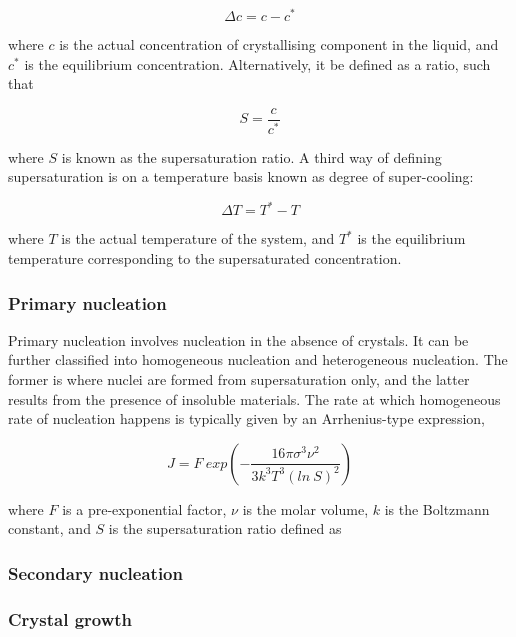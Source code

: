 \begin{equation}
    \Delta c = c - c^*
\end{equation}

\noindent where $c$ is the actual concentration of crystallising component in the liquid, and $c^*$ is the equilibrium concentration. Alternatively, it be defined as a ratio, such that

\begin{equation}
    S = \frac{c}{c^*}
\end{equation}

\noindent where $S$ is known as the supersaturation ratio. A third way of defining supersaturation is on a temperature basis known as degree of super-cooling:

\begin{equation}
     \Delta T = T^* - T 
\end{equation}

\noindent where $T$ is the actual temperature of the system, and $T^*$ is the equilibrium temperature corresponding to the supersaturated concentration. 

\subsubsection{Primary nucleation}

Primary nucleation involves nucleation in the absence of crystals. \cite{seader_separation_2011} It can be further classified into homogeneous nucleation and heterogeneous nucleation. The former is where nuclei are formed from supersaturation only, and the latter results from the presence of insoluble materials. \cite{richardson} The rate at which homogeneous rate of nucleation happens is typically given by an Arrhenius-type expression, \cite{richardson}

\begin{equation}
     J = F~exp(-\frac{16 \pi \sigma^3 \nu^2}{3 k^3 T^3 (ln~S)^2})
\end{equation}

\noindent where $F$ is a pre-exponential factor, $\nu$ is the molar volume, $k$ is the Boltzmann constant, and $S$ is the supersaturation ratio defined as



\subsubsection{Secondary nucleation}

\subsubsection{Crystal growth}


